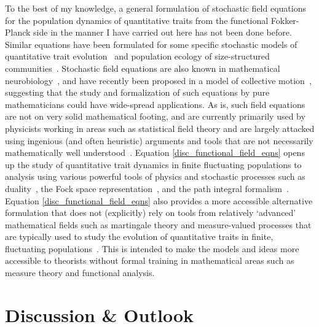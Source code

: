 To the best of my knowledge, a general formulation of stochastic field equations for the population dynamics of quantitative traits from the functional Fokker-Planck side in the manner I have carried out here has not been done before. Similar equations have been formulated for some specific stochastic models of quantitative trait evolution~\citep{rogers_demographic_2012,rogers_modes_2015} and population ecology of size-structured communities~\citep{odwyer_integrative_2009}. Stochastic field equations are also known in mathematical neurobiology~\citep{buice_field-theoretic_2007,bressloff_stochastic_2010,coombes_neural_2014}, and have recently been proposed in a model of collective motion~\citep{o_laighleis_minimal_2018}, suggesting that the study and formalization of such equations by pure mathematicians could have wide-spread applications. As is, such field equations are not on very solid mathematical footing, and are currently primarily used by physicists working in areas such as statistical field theory and are largely attacked using ingenious (and often heuristic) arguments and tools that are not necessarily mathematically well understood~\citep{carmona_stochastic_1999}. Equation \eqref{disc_functional_field_eqns} opens up the study of quantitative trait dynamics in finite fluctuating populations to analysis using various powerful tools of physics and stochastic processes such as duality~\citep{greenman_duality_2020}, the Fock space representation~\citep{dodd_many-body_2009, del_razo_probabilistic_2022}, and the path integral formalism~\citep{doi_second_1976, peliti_path_1985, dodd_many-body_2009, chow_path_2015, weber_master_2017}. Equation \eqref{disc_functional_field_eqns} also provides a more accessible alternative formulation that does not (explicitly) rely on tools from relatively `advanced' mathematical fields such as martingale theory and measure-valued processes that are typically used to study the evolution of quantitative traits in finite, fluctuating populations~\citep{dawson_stochastic_1975,fleming_measure-valued_1979,ethier_markov_1986,champagnat_unifying_2006,etheridge_mathematical_2011,week_white_2021}. This is intended to make the models and ideas more accessible to theorists without formal training in mathematical areas such as measure theory and functional analysis.


\section{Discussion \& Outlook}\label{sec_disc}

